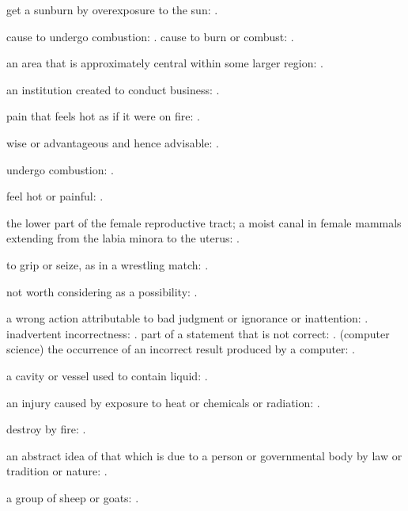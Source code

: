   get a sunburn by overexposure to the sun:   .

  cause to undergo combustion:   . cause to burn or combust:   .

  an area that is approximately central within some larger region:   .

  an institution created to conduct business: .

  pain that feels hot as if it were on fire:   .

  wise or advantageous and hence advisable: .

  undergo combustion:   .

  feel hot or painful: .

  the lower part of the female reproductive tract; a moist canal in female mammals extending from the labia minora to the uterus: .

  to grip or seize, as in a wrestling match:   .

  not worth considering as a possibility: .

  a wrong action attributable to bad judgment or ignorance or inattention:   . inadvertent incorrectness:   . part of a statement that is not correct:   . (computer science) the occurrence of an incorrect result produced by a computer:   .

  a cavity or vessel used to contain liquid: .

  an injury caused by exposure to heat or chemicals or radiation: .

  destroy by fire:   .

  an abstract idea of that which is due to a person or governmental body by law or tradition or nature: .

  a group of sheep or goats:   .


